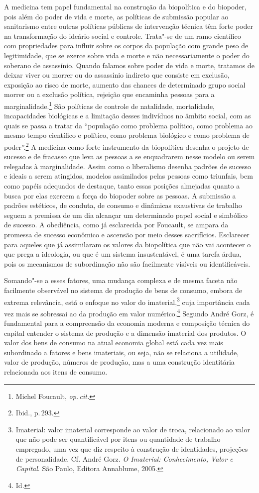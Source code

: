 A medicina tem papel fundamental na construção da biopolítica e do
biopoder, pois além do poder de vida e morte, as políticas de submissão
popular ao sanitarismo entre outras políticas públicas de intervenção
técnica têm forte poder na transformação do ideário social e controle.
Trata"-se de um ramo científico com propriedades para influir sobre os
corpos da população com grande peso de legitimidade, que se exerce sobre
vida e morte e não necessariamente o poder do soberano de assassínio.
Quando falamos sobre poder de vida e morte, tratamos de deixar viver ou
morrer ou do assassínio indireto que consiste em exclusão, exposição ao
risco de morte, aumento das chances de determinado grupo social morrer
ou a exclusão política, rejeição que encaminha pessoas para a
marginalidade.\footnote{Michel Foucault, \textit{op.\,cit.}} São políticas de controle de natalidade,
mortalidade, incapacidades biológicas e a limitação desses indivíduos no
âmbito social, com as quais se passa a tratar da ``população como
problema político, como problema ao mesmo tempo científico e político,
como problema biológico e como problema de poder''.\footnote{Ibid., p.\,293.} A medicina como
forte instrumento da biopolítica desenha o projeto de sucesso e de
fracasso que leva as pessoas a se enquadrarem nesse modelo ou serem
relegadas à marginalidade. Assim como o liberalismo desenha padrões de
sucesso e ideais a serem atingidos, modelos assimilados pelas pessoas
como triunfais, bem como papéis adequados de destaque, tanto essas
posições almejadas quanto a busca por elas exercem a força do biopoder
sobre as pessoas. A submissão a padrões estéticos, de conduta, de
consumo e dinâmicas exaustivas de trabalho seguem a premissa de um dia
alcançar um determinado papel social e simbólico de sucesso. A
obediência, como já esclarecida por Foucault, se ampara da promessa
de sucesso econômico e ascensão por meio desses sacrifícios. Esclarecer
para aqueles que já assimilaram os valores da biopolítica que não vai
acontecer o que prega a ideologia, ou que é um sistema insustentável, é
uma tarefa árdua, pois os mecanismos de subordinação não são facilmente
visíveis ou identificáveis.

Somando"-se a esses fatores, uma mudança complexa e de mesma faceta não
facilmente observável no sistema de produção de bens de consumo, embora
de extrema relevância, está o enfoque no valor do imaterial,\footnote{Imaterial:
  valor imaterial corresponde ao valor de troca, relacionado ao valor
  que não pode ser quantificável por itens ou quantidade de trabalho
  empregado, uma vez que diz respeito à construção de identidades,
  projeções de personalidade. Cf. André Gorz. \emph{O Imaterial: Conhecimento, Valor e Capital}. São Paulo, Editora Annablume, 2005.} cuja importância cada vez
mais se sobressai ao da produção em valor numérico.\footnote{Id.} Segundo
André Gorz, é fundamental para a compreensão da economia moderna e
composição técnica do capital entender o sistema de produção e a
dimensão imaterial dos produtos. O valor dos bens de consumo na atual
economia global está cada vez mais subordinado a fatores e bens
imateriais, ou seja, não se relaciona a utilidade, valor de produção,
números de produção, mas a uma construção identitária relacionada aos
itens de consumo.

